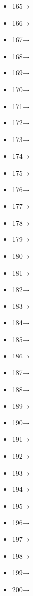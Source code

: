 \documentclass[A4,12pt]{article}
\begin{document}
\begin{itemize}[noitemsep]
		\item 165→ 
		\item 166→ 
		\item 167→ 
		\item 168→ 
		\item 169→ 
		\item 170→ 
		\item 171→ 
		\item 172→ 
		\item 173→ 
		\item 174→ 
		\item 175→ 
		\item 176→ 
		\item 177→ 
		\item 178→ 
		\item 179→ 
		\item 180→ 
		\item 181→ 
		\item 182→ 
		\item 183→ 
		\item 184→ 
		\item 185→ 
		\item 186→ 
		\item 187→ 
		\item 188→ 
		\item 189→ 
		\item 190→ 
		\item 191→ 
		\item 192→ 
		\item 193→ 
		\item 194→ 
		\item 195→ 
		\item 196→ 
		\item 197→ 
		\item 198→ 
		\item 199→ 
		\item 200→
		
	\end{itemize}
	
		
	
\end{document}
